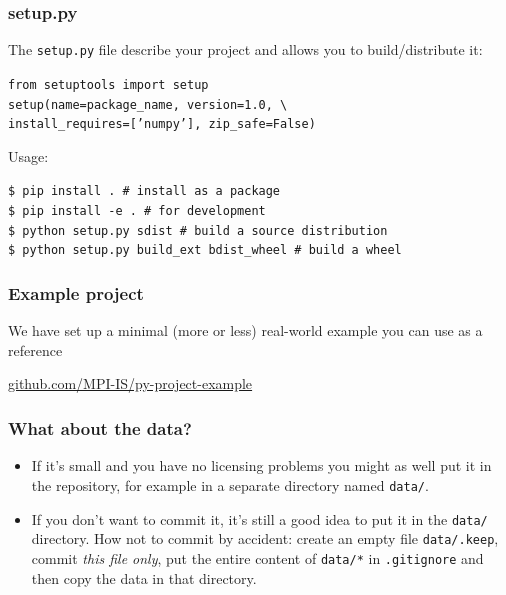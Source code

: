 \documentclass[compress,english,aspectratio=1610]{beamer}
\let\olditem\item
\renewcommand{\item}{\setlength{\itemsep}{\fill}\olditem}
\begin{document}
\begin{frame}[fragile]
  \frametitle{setup.py}
  The {\tt setup.py} file describe your project and allows you to build/distribute it:
  \begin{tcolorbox}[colback=mpg-gray,colframe=mpg-green,title=Contents of setup file]
	{\tt from setuptools import setup}\\
	{\tt setup(name=package\_name, version=1.0, \verb|\|}\\
	{\tt install\_requires=['numpy'], zip\_safe=False)}
  \end{tcolorbox}

  Usage:
  \begin{tcolorbox}[colback=mpg-gray,colframe=mpg-green,title=Commands]
	{\tt \$ pip install . \# install as a package}\\
	{\tt \$ pip install -e . \# for development}\\
	{\tt \$ python setup.py sdist \# build a source distribution}\\
	{\tt \$ python setup.py build\_ext bdist\_wheel \# build a wheel}
  \end{tcolorbox}
\end{frame}

\begin{frame}[fragile]
  \frametitle{Example project}
  We have set up a minimal (more or less) real-world example you can use as a reference

  \begin{center}
    \href{https://github.com/MPI-IS/py-project-example}{github.com/MPI-IS/py-project-example}
  \end{center}
\end{frame}

\begin{frame}[fragile]
\frametitle{What about the data?}
  \begin{itemize}
  \item If it's small and you have no licensing problems you might as well put it in the repository, for example in a separate directory named \texttt{data/}.
  \item If you don't want to commit it, it's still a good idea to put it in the \texttt{data/} directory. How not to commit by accident: create an empty file \texttt{data/.keep}, commit \textit{this file only}, put the entire content of \texttt{data/*} in \texttt{.gitignore} and then copy the data in that directory.
  \end{itemize}
\end{frame}
\end{document}

